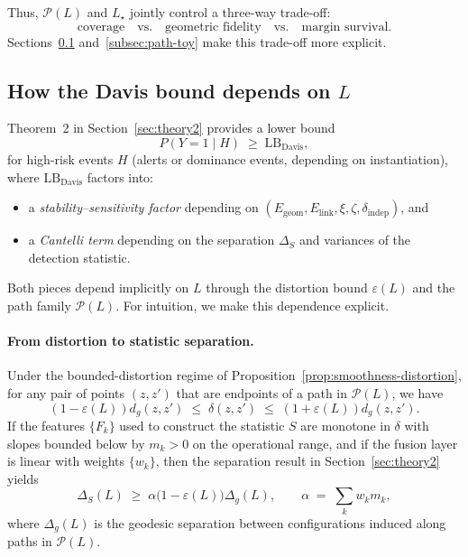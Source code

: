\documentclass[11pt]{article}
\theoremstyle{remark}
\theoremstyle{plain}
\begin{document}
Thus, $\mathcal{P}(L)$ and $L_\star$ jointly control a three-way trade-off:
\[
\text{coverage} \quad\text{vs.}\quad \text{geometric fidelity} \quad\text{vs.}\quad \text{margin survival}.
\]
Sections~\ref{subsec:path-L-dependence} and~\ref{subsec:path-toy} make this trade-off more explicit.

\subsection{How the Davis bound depends on $L$}
\label{subsec:path-L-dependence}

Theorem~2 in Section~\ref{sec:theory2} provides a lower bound
\[
P(Y = 1 \mid H) \;\ge\; \mathrm{LB}_{\text{Davis}},
\]
for high-risk events $H$ (alerts or dominance events, depending on instantiation), where
$\mathrm{LB}_{\text{Davis}}$ factors into:
\begin{itemize}[leftmargin=*]
  \item a \emph{stability--sensitivity factor} depending on $(E_{\mathrm{geom}}, E_{\mathrm{link}}, \xi, \zeta, \delta_{\mathrm{indep}})$, and
  \item a \emph{Cantelli term} depending on the separation $\Delta_S$ and variances of the detection statistic.
\end{itemize}

Both pieces depend implicitly on $L$ through the distortion bound $\varepsilon(L)$ and the path
family $\mathcal{P}(L)$. For intuition, we make this dependence explicit.

\paragraph{From distortion to statistic separation.}
Under the bounded-distortion regime of Proposition~\ref{prop:smoothness-distortion}, for any
pair of points $(z,z')$ that are endpoints of a path in $\mathcal{P}(L)$, we have
\[
(1-\varepsilon(L)) d_g(z,z') \;\le\; \delta(z,z') \;\le\; (1+\varepsilon(L)) d_g(z,z').
\]
If the features $\{F_k\}$ used to construct the statistic $S$ are monotone in $\delta$ with slopes
bounded below by $m_k>0$ on the operational range, and if the fusion layer is linear with weights
$\{w_k\}$, then the separation result in Section~\ref{sec:theory2} yields
\begin{equation}
  \label{eq:deltaS-vs-L}
  \Delta_S(L) \;\ge\; \alpha \bigl(1-\varepsilon(L)\bigr) \Delta_g(L),
  \qquad
  \alpha \;=\; \sum_k w_k m_k,
\end{equation}
where $\Delta_g(L)$ is the geodesic separation between configurations induced along paths in
$\mathcal{P}(L)$.
\end{document}
